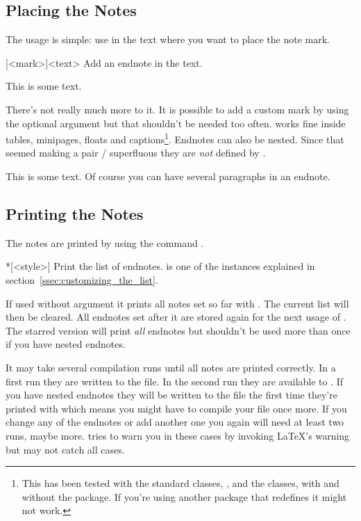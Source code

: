 \documentclass[toc=bib,toc=index]{cnpkgdoc}
\begin{document}
\subsection{Placing the Notes}
The usage is simple: use  in the text where you want to place the
note mark.
\begin{beschreibung}
 [<mark>]{<text>} Add an endnote in the text.
\end{beschreibung}
\begin{beispiel}
 This is some text.
\end{beispiel}
There's not really much more to it. It is possible to add a custom mark by
using the optional argument but that shouldn't be needed too often. 
works fine inside tables, minipages, floats and captions\footnote{This has been
tested with the standard classes, , and the 
classes, with and without the  package. If you're using another
package that redefines  it might not work.}. Endnotes can also be
nested. Since that seemed making a pair /
superfluous they are \emph{not} defined by \enotez.
\begin{beispiel}
 This is some text.
 Of course you can have several paragraphs\endnote{\kant[1-3]} in an endnote.
\end{beispiel}

\subsection{Printing the Notes}
The notes are printed by using the command .
\begin{beschreibung}
 *[<style>] Print the list of endnotes.  is
   one of the instances explained in section~\ref{ssec:customizing_the_list}.
\end{beschreibung}
If used without argument it prints all notes set so far with . The
current list will then be cleared. All endnotes set after it are stored again
for the next usage of . The starred version will print
\emph{all} endnotes but shouldn't be used more than once if you have nested
endnotes.

It may take several compilation runs until all notes are printed correctly. In
a first run they are written to the  file. In the second run they are
available to . If you have nested endnotes they will be written
to the  file the first time they're printed with 
which means you might have to compile your file once more. If you change any of
the endnotes or add another one you again will need at least two runs, maybe more.
\enotez tries to warn you in these cases by invoking \LaTeX's warning
but may not catch all cases.
\end{document}
